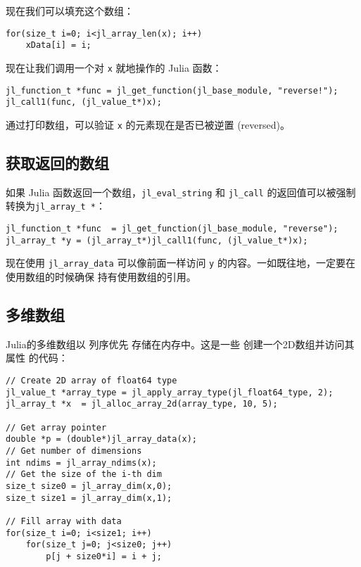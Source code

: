 现在我们可以填充这个数组：




\begin{lstlisting}
for(size_t i=0; i<jl_array_len(x); i++)
    xData[i] = i;
\end{lstlisting}



现在让我们调用一个对 \texttt{x} 就地操作的 Julia 函数：




\begin{lstlisting}
jl_function_t *func = jl_get_function(jl_base_module, "reverse!");
jl_call1(func, (jl_value_t*)x);
\end{lstlisting}



通过打印数组，可以验证 \texttt{x} 的元素现在是否已被逆置 (reversed)。



\hypertarget{10421624901695308393}{}


\subsection{获取返回的数组}



如果 Julia 函数返回一个数组，\texttt{jl\_eval\_string} 和 \texttt{jl\_call} 的返回值可以被强制转换为\texttt{jl\_array\_t *}：




\begin{lstlisting}
jl_function_t *func  = jl_get_function(jl_base_module, "reverse");
jl_array_t *y = (jl_array_t*)jl_call1(func, (jl_value_t*)x);
\end{lstlisting}



现在使用 \texttt{jl\_array\_data} 可以像前面一样访问 \texttt{y} 的内容。一如既往地，一定要在使用数组的时候确保 持有使用数组的引用。



\hypertarget{14703069974979105074}{}


\subsection{多维数组}



Julia的多维数组以 列序优先 存储在内存中。这是一些 创建一个2D数组并访问其属性 的代码：




\begin{lstlisting}
// Create 2D array of float64 type
jl_value_t *array_type = jl_apply_array_type(jl_float64_type, 2);
jl_array_t *x  = jl_alloc_array_2d(array_type, 10, 5);

// Get array pointer
double *p = (double*)jl_array_data(x);
// Get number of dimensions
int ndims = jl_array_ndims(x);
// Get the size of the i-th dim
size_t size0 = jl_array_dim(x,0);
size_t size1 = jl_array_dim(x,1);

// Fill array with data
for(size_t i=0; i<size1; i++)
    for(size_t j=0; j<size0; j++)
        p[j + size0*i] = i + j;
\end{lstlisting}



